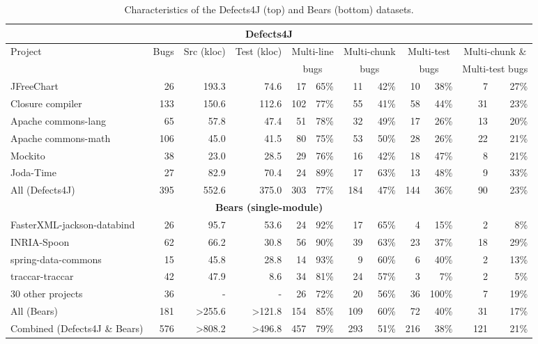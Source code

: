 \documentclass[sigconf, timestamp-false, anonymous=true]{acmart}
\begin{document}
\begin{table*}
\begin{center}
\begin{tabular}{l | rrr | rr | rr | rr | rr}
\toprule
\multicolumn{12}{c}{\textbf{Defects4J}} \\
\midrule
Project & Bugs & Src (kloc) & Test (kloc) & \multicolumn{2}{c}{Multi-line} & \multicolumn{2}{c}{Multi-chunk} 
		& \multicolumn{2}{c}{Multi-test} & \multicolumn{2}{c}{Multi-chunk \&}\\
&&&&\multicolumn{2}{c}{bugs}&\multicolumn{2}{c}{bugs}&\multicolumn{2}{c}{bugs}&\multicolumn{2}{c}{Multi-test bugs}\\
\midrule
JFreeChart  & 26 & 193.3 & 74.6 & 17 & 65\% & 11 & 42\% & 10 & 38\% & 7 & 27\%\\
Closure compiler & 133 & 150.6 & 112.6 & 102 & 77\% & 55 & 41\% & 58 & 44\% & 31 & 23\%\\
Apache commons-lang & 65 & 57.8 & 47.4 & 51 & 78\% & 32 & 49\% & 17 & 26\% & 13 & 20\%\\
Apache commons-math & 106 & 45.0 & 41.5 & 80 & 75\% & 53 & 50\% & 28 & 26\% & 22 & 21\%\\
Mockito & 38 & 23.0 & 28.5 & 29 & 76\% & 16 & 42\% & 18 & 47\% & 8 & 21\%\\
Joda-Time & 27 & 82.9 & 70.4 & 24 & 89\% & 17 & 63\% & 13 & 48\% & 9 & 33\%\\
\midrule
All (Defects4J) & 395 & 552.6 & 375.0 & 303 & 77\% & 184 & 47\% & 144 & 36\% & 90 & 23\%\\
\midrule
\multicolumn{12}{c}{\textbf{Bears (single-module)}} \\
\midrule
FasterXML-jackson-databind & 26 & 95.7 & 53.6 & 24 & 92\% & 17 & 65\% & 4 & 15\% & 2 & 8\%\\
INRIA-Spoon & 62 & 66.2 & 30.8 & 56 & 90\% & 39 & 63\% & 23 & 37\% & 18 & 29\%\\
spring-data-commons & 15 & 45.8 & 28.8 & 14 & 93\% & 9 & 60\% & 6 & 40\% & 2 & 13\%\\
traccar-traccar & 42 & 47.9 & 8.6 & 34 & 81\% & 24 & 57\% & 3 & 7\% & 2 & 5\%\\
30 other projects & 36 & - & - & 26 & 72\% & 20 & 56\% & 36 & 100\% & 7 & 19\%\\
\midrule
All (Bears) & 181 & >255.6 & >121.8 & 154 & 85\% & 109 & 60\% & 72 & 40\% & 31 & 17\% \\
\midrule
Combined (Defects4J \& Bears) & 576 & >808.2 & >496.8 & 457 & 79\% & 293 & 51\% & 216 & 38\% & 121 & 21\%\\
\bottomrule
\end{tabular}
\end{center}
\caption{\label{tab:data} Characteristics of the Defects4J (top) and Bears (bottom) datasets.}
\end{table*}
\end{document}
